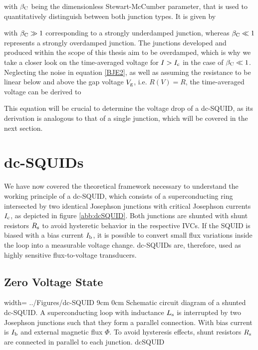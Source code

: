 
with $\beta_{\rm C}$ being the dimensionless Stewart-McCumber parameter, that is used to quantitatively distinguish between both junction types. It is given by 


with $\beta_{\rm C}\gg 1$ corresponding to a strongly underdamped junction, whereas $\beta_{\rm C}\ll 1$ represents a strongly overdamped junction. The junctions developed and produced within the scope of this thesis aim to be overdamped, which is why we take a closer look on the time-averaged voltage for $I>I_{\rm c}$ in the case of $ \beta_{\rm C}\ll 1$. Neglecting the noise in equation \ref{BJE2}, as well as assuming the resistance to be linear below and above the gap voltage $V_{\rm g}$, i.e. $R(V)=R$, the time-averaged voltage can be derived to \cite{Clarke2004}


This equation will be crucial to determine the voltage drop of a dc-SQUID, as its derivation is analogous to that of a single junction, which will be covered in the next section.

\section{dc-SQUIDs}

We have now covered the theoretical framework necessary to understand the working principle of a dc-SQUID, which consists of a superconducting ring intersected by two identical Josephson junctions with critical Josephson currents $I_{\rm c}$, as depicted in figure \ref{abb:dcSQUID}. Both junctions are shunted with shunt resistors $R_{\rm s}$ to avoid hysteretic behavior in the respective IVCs. If the SQUID is biased with a bias current $I_{\rm b}$, it is possible to convert small flux variations inside the loop into a measurable voltage change. dc-SQUIDs are, therefore, used as highly sensitive flux-to-voltage transducers.

\subsection{Zero Voltage State}

{width=\textwidth} %
{../Figures/dc-SQUID}
{9cm} %
{0cm}
{Schematic circuit diagram of a shunted dc-SQUID. A superconducting loop with inductance $L_{\rm s}$ is interrupted by two Josephson junctions such that they form a parallel connection. With bias current is $I_{\rm b}$ and external magnetic flux $\Phi$. To avoid hysteresis effects, shunt resistors $R_{\rm s}$ are connected in parallel to each junction.} 
{dcSQUID}

